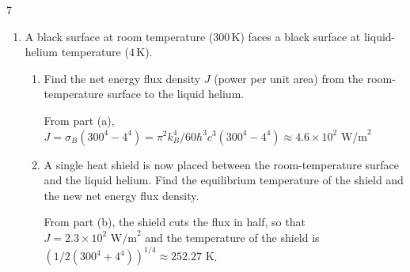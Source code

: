 \documentclass[11pt]{article}
\begin{document}
\begin{problem}{7}
\begin{enumerate}[label=(\alph*)]
  \item A black surface at room temperature (\( 300\,\mathrm{K} \)) faces a black surface at liquid-helium temperature (\( 4\,\mathrm{K} \)).
  \begin{enumerate}[label=(\roman*)]
    \item Find the net energy flux density \( J \) (power per unit area) from the room-temperature surface to the liquid helium.
          \begin{answer}
            From part (a), \( J = \sigma_B(300^4 - 4^4) = \pi^2k_B^4/60\hbar^3 c^3 (300^4 - 4^4) \approx 4.6 \times 10^2 \text{ W/m}^2\)
          \end{answer}
    \item A single heat shield is now placed between the room-temperature surface and the liquid helium.
    Find the equilibrium temperature of the shield and the new net energy flux density.
          \begin{answer}
            From part (b), the shield cuts the flux in half, so that \( J = 2.3 \times 10^2 \text{ W/m}^2 \) and the temperature of the shield is \( (1/2(300^4 + 4^4))^{1/4} \approx 252.27 \text{ K}\).
          \end{answer}
  \end{enumerate}
\end{enumerate}
\end{problem}
\end{document}
